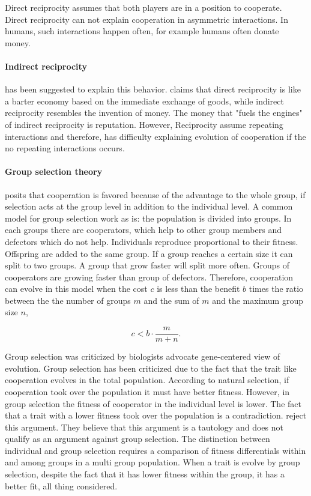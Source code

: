 \documentclass[12pt]{extarticle}
\begin{document}
Direct reciprocity assumes that both players are in a position to cooperate. Direct reciprocity can not explain cooperation in asymmetric interactions. In humans, such interactions happen often, for example humans often donate money. 

\paragraph{Indirect reciprocity} has been suggested to explain this behavior.
\citet{nowak2006five} claims that direct reciprocity is like a barter economy based on the immediate exchange of goods, while indirect reciprocity resembles the invention of money. The money that "fuels the engines" of indirect reciprocity is reputation. 
However, Reciprocity assume repeating interactions and therefore, has difficulty explaining evolution of cooperation if the no repeating interactions occurs. 

\paragraph{Group selection theory} posits that cooperation is favored because of the advantage to the whole group, if selection acts at the group level in addition to the individual level. A common model for group selection work as is: the population is divided into groups. In each groups there are cooperators, which help to other group members and defectors which do not help.  %
Individuals reproduce proportional to their fitness. Offspring are added to the same group.
If a group reaches a certain size it can split to two groups. A group that grow faster will split more often.
Groups of cooperators are growing faster than group of defectors.
Therefore, cooperation can evolve in this model when the cost $c$ is less than the benefit $b$ times the ratio between the  the number of groups $m$ and the sum of $m$ and the maximum group size $n$,

\begin{equation} \label{eq:groupselection}
c < b \cdot \frac{m}{m+n} .
\end{equation}

Group selection was criticized by biologists advocate gene-centered view of evolution. Group selection has been criticized due to the fact that the trait like cooperation evolves in the total population. According to natural selection, if cooperation took over the population it must have better fitness. However, in group selection the fitness of cooperator in the individual level is lower. The fact that a trait with a lower fitness took over the population is a contradiction. \citet{eldakar2011eight} reject this argument. They believe that this argument is a tautology and does not qualify as an argument against group selection. The distinction between individual and group selection requires a comparison of fitness differentials within and among groups in a multi group population. When a trait is evolve by group selection, despite the fact that it has lower fitness within the group, it has a better fit, all thing considered. 
\end{document}
